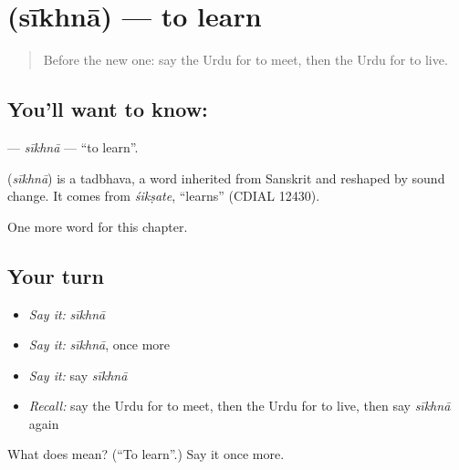 \section[\texorpdfstring{\ur{سیکھنا} (sīkhnā)}{سیکھنا (sīkhnā)}]{ (sīkhnā) — to learn}

\label{lesson:UR-C50-sikhna}



\begin{quote}
Before the new one: say the Urdu for to meet, then the Urdu for to live.
\end{quote}

\subsection*{You'll want to know: }
\textbf{} — \emph{sīkhnā} — \textquotedblleft{}to learn\textquotedblright{}.

\begin{cousinweb}
\textbf{} (\emph{sīkhnā}) is a tadbhava, a word inherited from Sanskrit and reshaped by sound change. It comes from \emph{śikṣate}, \textquotedblleft{}learns\textquotedblright{} (CDIAL 12430).
\end{cousinweb}

\begin{grammarlens}[title={What you've built}]
One more word for this chapter.
\end{grammarlens}

\subsection*{Your turn}
\begin{itemize}
\raggedright
  \item \emph{Say it:} \emph{sīkhnā}
  \item \emph{Say it:} \emph{sīkhnā}, once more
  \item \emph{Say it:} say \emph{sīkhnā}
  \item \emph{Recall:} say the Urdu for to meet, then the Urdu for to live, then say \emph{sīkhnā} again
\end{itemize}

\begin{tcolorbox}[breakable,colback=teal!4,colframe=teal!35!black,title={Before you move on}]
What does  mean? (\textquotedblleft{}To learn\textquotedblright{}.) Say it once more.
\end{tcolorbox}
